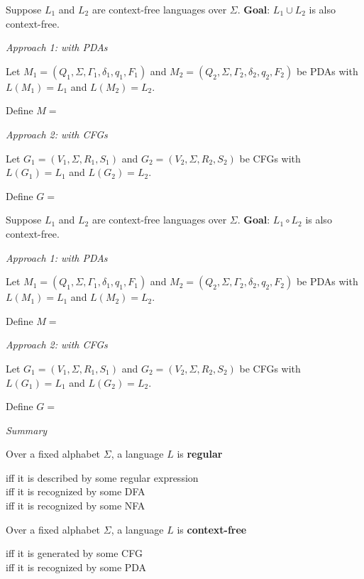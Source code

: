 \documentclass[12pt, oneside]{article}
\begin{document}
\vfill

\newpage
Suppose $L_1$ and $L_2$ are context-free languages over $\Sigma$.  {\bf Goal}:  $L_1 \cup L_2$  is  also context-free.

{\it Approach 1: with  PDAs}

Let $M_1 = ( Q_1, \Sigma, \Gamma_1, \delta_1, q_1, F_1)$ and
$M_2 = ( Q_2, \Sigma, \Gamma_2, \delta_2, q_2, F_2)$ be PDAs with 
$L(M_1) =  L_1$  and  $L(M_2) = L_2$.

Define $M = $

\vfill

{\it Approach  2: with CFGs}

Let $G_1 = (V_1, \Sigma, R_1, S_1)$  and   $G_2 = (V_2, \Sigma, R_2, S_2)$  be CFGs  with
$L(G_1) =  L_1$  and  $L(G_2) = L_2$.

Define $G = $

\vfill

\newpage
Suppose $L_1$ and $L_2$ are context-free languages over $\Sigma$.  {\bf Goal}:  $L_1 \circ L_2$  is  also context-free.


{\it Approach 1: with  PDAs}

Let $M_1 = ( Q_1, \Sigma, \Gamma_1, \delta_1, q_1, F_1)$ and
$M_2 = ( Q_2, \Sigma, \Gamma_2, \delta_2, q_2, F_2)$ be PDAs with 
$L(M_1) =  L_1$  and  $L(M_2) = L_2$.

Define $M = $

\vfill

{\it Approach  2: with CFGs}

Let $G_1 = (V_1, \Sigma, R_1, S_1)$  and   $G_2 = (V_2, \Sigma, R_2, S_2)$  be CFGs  with
$L(G_1) =  L_1$  and  $L(G_2) = L_2$.

Define $G = $

\vfill
\newpage

{\it Summary}

Over a fixed alphabet $\Sigma$, a language $L$ is {\bf regular}

\vspace{-20pt}
\begin{center}
    iff it is described by some regular expression \\
    iff it is recognized by some DFA\\
    iff it is recognized by some NFA
\end{center}

Over a fixed alphabet $\Sigma$, a language $L$ is {\bf context-free}

\vspace{-20pt}
\begin{center}
    iff it is generated by some CFG\\
    iff it is recognized by some PDA
\end{center}
\end{document}

